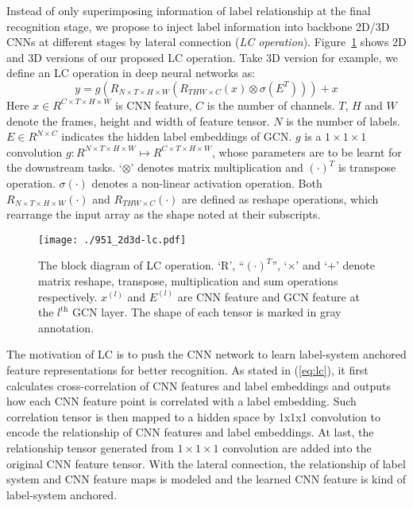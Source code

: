 \documentclass[letterpaper]{article} \usepackage{aaai20}  \usepackage{times}  \usepackage{helvet} \usepackage{courier}  \usepackage[hyphens]{url}  \usepackage{graphicx} \usepackage{subfigure}
\begin{document}
Instead of only superimposing information of label relationship at the final recognition stage, we propose to inject label information into backbone 2D/3D CNNs at different stages by lateral connection (\emph{LC operation}).
Figure~\ref{connect} shows 2D and 3D versions of our proposed LC operation. Take 3D version for example, we define an LC operation in deep neural networks as:
\begin{equation}\label{eq:lc}
y = g(R_{N\times T\times H \times W}(R_{THW \times C}(x) \otimes \sigma(E^T))) + x
\end{equation}
Here $x \in R^{C\times T\times H \times W}$ is CNN feature, $C$ is the number of channels. $T$, $H$ and $W$ denote the frames, height and width of feature tensor. $N$ is the number of labels. $E \in R^{N \times C}$ indicates the hidden label embeddings of GCN. $g$ is a $1\times 1\times 1$ convolution $g: R^{N \times T\times H\times W} \mapsto R^{C \times T\times H\times W}$, whose parameters are to be learnt for the downstream tasks. `$\otimes$' denotes matrix multiplication and $(\cdot)^T$ is transpose operation. $\sigma(\cdot)$ denotes a non-linear activation operation. Both $R_{N\times T\times H\times W}(\cdot)$ and $R_{THW \times C}(\cdot)$ are defined as reshape operations, which rearrange the input array as the shape noted at their subscripts.

\begin{figure}
	\centering
	\texttt{[image: ./951\_2d3d-lc.pdf]}
	\caption{The block diagram of LC operation. `R', ``$(\cdot)^T$'', `$\times$' and `$+$' denote matrix reshape, transpose, multiplication and sum operations respectively. $x^{(l)}$ and $E^{(l)}$ are CNN feature and GCN feature at the $l^{\text{th}}$ GCN layer. The shape of each tensor is marked in gray annotation.}
	\label{connect}
\end{figure}
  
The motivation of LC is to push the CNN network to learn label-system anchored feature representations for better recognition. As stated in (\ref{eq:lc}), it first calculates cross-correlation of CNN features and label embeddings and outputs how each CNN feature point is correlated with a label embedding. Such correlation tensor is then mapped to a hidden space by 1x1x1 convolution to encode the relationship of CNN features and label embeddings. At last, the relationship tensor generated from $1\times1\times1$ convolution are added into the original CNN feature tensor. With the lateral connection, the relationship of label system and CNN feature maps is modeled and the learned CNN feature is kind of label-system anchored.
\end{document}
